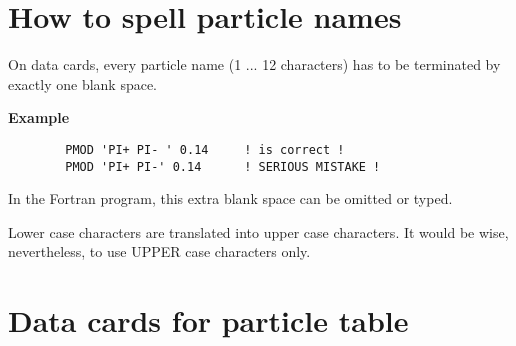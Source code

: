 \section{\label{sec-PTH}How to spell particle names}
\par
On data cards, every particle name (1 ... 12 characters) has to be
terminated by exactly one blank space.
\par
{\bf Example}
\begin{verbatim}
        PMOD 'PI+ PI- ' 0.14     ! is correct !
        PMOD 'PI+ PI-' 0.14      ! SERIOUS MISTAKE !
\end{verbatim}
\par
In the Fortran program, this extra blank space can be omitted or typed.
\par
Lower case characters are translated into upper case characters.
It would be wise, nevertheless, to use UPPER case characters only.
 
\section{\label{sec-PTDC}Data cards for particle table}
\par
